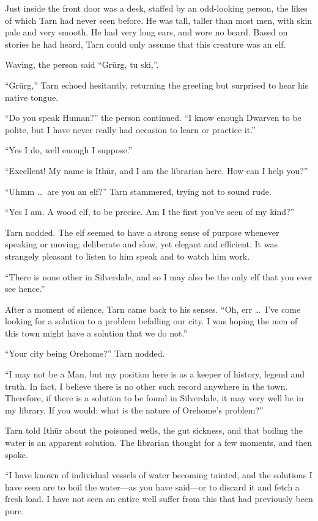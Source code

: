 Just inside the front door was a desk, staffed by an odd-looking person, the likes of which Tarn had never seen before.  He was tall, taller than most men, with skin pale and very smooth.  He had very long ears, and wore no beard.  Based on stories he had heard, Tarn could only assume that this creature was an elf.

Waving, the person said ``Gr\=urg, tu ski,''.

``Gr\=urg,'' Tarn echoed hesitantly, returning the greeting but surprised to hear his native tongue.

``Do you speak Human?'' the person continued.  ``I know enough Dwarven to be polite, but I have never really had occasion to learn or practice it.''

``Yes I do, well enough I suppose.''

``Excellent!  My name is Ith\=ur, and I am the librarian here.  How can I help you?''

``Uhmm \ldots\ are you an elf?'' Tarn stammered, trying not to sound rude.

``Yes I am.  A wood elf, to be precise.  Am I the first you've seen of my kind?''

Tarn nodded.  The elf seemed to have a strong sense of purpose whenever speaking or moving; deliberate and slow, yet elegant and efficient.  It was strangely pleasant to listen to him speak and to watch him work.

``There is none other in Silverdale, and so I may also be the only elf that you ever see hence.''

After a moment of silence, Tarn came back to his senses.  ``Oh, err \ldots\ I've come looking for a solution to a problem befalling our city.  I was hoping the men of this town might have a solution that we do not.''

``Your city being Orehome?''  Tarn nodded.

``I may not be a Man, but my position here is as a keeper of history, legend and truth.  In fact, I believe there is no other such record anywhere in the town.  Therefore, if there is a solution to be found in Silverdale, it may very well be in my library. If you would: what is the nature of Orehome's problem?''

Tarn told Ith\=ur about the poisoned wells, the gut sickness, and that boiling the water is an apparent solution.  The librarian thought for a few moments, and then spoke.

``I have known of individual vessels of water becoming tainted, and the solutions I have seen are to boil the water---as you have said---or to discard it and fetch a fresh load.  I have not seen an entire well suffer from this that had previously been pure.

